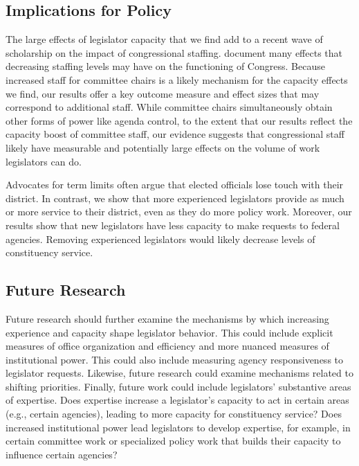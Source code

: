 \documentclass[12pt]{article}
\begin{document}
\subsection{Implications for Policy}

The large effects of legislator capacity that we find add to a recent wave of scholarship on the impact of congressional staffing. \citet{LaPira2020} document many effects that decreasing staffing levels may have on the functioning of Congress. Because increased staff for committee chairs is a likely mechanism for the capacity effects we find, our results offer a key outcome measure and effect sizes that may correspond to additional staff.  
While committee chairs simultaneously obtain other forms of power like agenda control, to the extent that our results reflect the capacity boost of committee staff, 
our evidence suggests that congressional staff likely have measurable and potentially large effects on the volume of work legislators can do. 

Advocates for term limits often argue that elected officials lose touch with their district. In contrast, we show that more experienced legislators provide as much or more service to their district, even as they do more policy work. Moreover, our results show that new legislators have less capacity to make requests to federal agencies. Removing experienced legislators would likely decrease levels of constituency service. 



\subsection{Future Research}

Future research should further examine the mechanisms by which increasing experience and capacity shape legislator behavior. This could include explicit measures of office organization and efficiency and more nuanced measures of institutional power. This could also include measuring agency responsiveness to legislator requests. Likewise, future research could examine mechanisms related to shifting priorities. Finally, future work could include legislators' substantive areas of expertise. Does expertise increase a legislator's capacity to act in certain areas (e.g., certain agencies), leading to more capacity for constituency service? Does increased institutional power lead legislators to develop expertise, for example, in certain committee work or specialized policy work that builds their capacity to influence certain agencies? 
\end{document}
